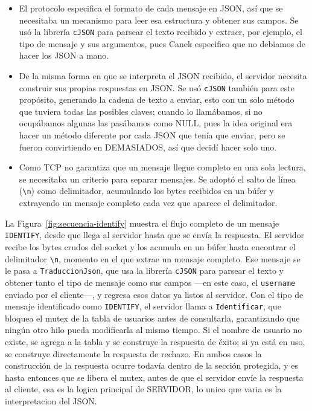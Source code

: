 \documentclass{article}
\begin{document}
\begin{itemize}
    \item El protocolo especifica el formato de cada mensaje en JSON, así que se
    necesitaba un mecanismo para leer esa estructura y obtener sus campos.
    Se usó la librería \texttt{cJSON} para parsear el texto recibido y
    extraer, por ejemplo, el tipo de mensaje y sus argumentos, pues Canek especifico que no debiamos de hacer los JSON a mano.

    \item De la misma forma en que se interpreta el JSON recibido, el servidor
    necesita construir sus propias respuestas en JSON. Se usó \texttt{cJSON}
    también para este propósito, generando la cadena de texto a enviar, esto
    con un solo método que tuviera todas las posibles claves; cuando lo
    llamábamos, si no ocupábamos algunas las pasábamos como NULL, pues la idea
    original era hacer un método diferente por cada JSON que tenía que enviar,
    pero se fueron convirtiendo en DEMASIADOS, así que decidí hacer solo uno.

    \item Como TCP no garantiza que un mensaje llegue completo en una sola lectura,
    se necesitaba un criterio para separar mensajes. Se adoptó el salto de
    línea (\texttt{\textbackslash n}) como delimitador, acumulando los bytes
    recibidos en un búfer y extrayendo un mensaje completo cada vez que
    aparece el delimitador.
\end{itemize}

La Figura~\ref{fig:secuencia-identify} muestra el flujo completo de un mensaje
\texttt{IDENTIFY}, desde que llega al servidor hasta que se envía la
respuesta. El servidor recibe los bytes crudos del socket y los acumula en un
búfer hasta encontrar el delimitador \texttt{\textbackslash n}, momento en el
que extrae un mensaje completo. Ese mensaje se le pasa a
\texttt{TraduccionJson}, que usa la librería \texttt{cJSON} para parsear el
texto y obtener tanto el tipo de mensaje como sus campos —en este caso, el
\texttt{username} enviado por el cliente—, y regresa esos datos ya listos al
servidor. Con el tipo de mensaje identificado como \texttt{IDENTIFY}, el
servidor llama a \texttt{Identificar}, que bloquea el mutex de la tabla de
usuarios antes de consultarla, garantizando que ningún otro hilo pueda
modificarla al mismo tiempo. Si el nombre de usuario no existe, se agrega a la
tabla y se construye la respuesta de éxito; si ya está en uso, se construye
directamente la respuesta de rechazo. En ambos casos la construcción de la
respuesta ocurre todavía dentro de la sección protegida, y es hasta entonces
que se libera el mutex, antes de que el servidor envíe la respuesta al
cliente, esa es la logica principal de SERVIDOR, lo unico que varia es la interpretacion del JSON.
\end{document}
